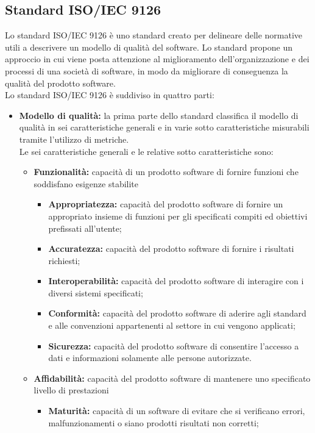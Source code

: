   	\subsection{Standard ISO/IEC 9126}
  	Lo standard ISO/IEC 9126 è uno standard creato per delineare delle normative utili a descrivere un modello di qualità del software. Lo standard propone un approccio in cui viene posta attenzione al miglioramento dell'organizzazione e dei processi di una società di software, in modo da migliorare di conseguenza la qualità del prodotto software.\\
  	Lo standard ISO/IEC 9126 è suddiviso in quattro parti:
		\begin{itemize}
			\item \textbf{Modello di qualità: } la prima parte dello standard classifica il modello di qualità in sei caratteristiche generali e in varie sotto caratteristiche misurabili tramite l'utilizzo di metriche.\\
			Le sei caratteristiche generali e le relative sotto caratteristiche sono:
				\begin{itemize}
					\item \textbf{Funzionalità:} capacità di un prodotto software di fornire funzioni che soddisfano esigenze stabilite
						\begin{itemize}
							\item \textbf{Appropriatezza:} capacità del prodotto software di fornire un appropriato insieme di funzioni per gli specificati compiti ed obiettivi prefissati all'utente;
							\item \textbf{Accuratezza:} capacità del prodotto software di fornire i risultati richiesti;
							\item \textbf{Interoperabilità:} capacità del prodotto software di interagire con i diversi sistemi specificati;
							\item \textbf{Conformità:} capacità del prodotto software di aderire agli standard e alle convenzioni appartenenti al settore in cui vengono applicati;
							\item \textbf{Sicurezza:} capacità del prodotto software di consentire l'accesso a dati e informazioni solamente alle persone autorizzate.
						\end{itemize}
					\item \textbf{Affidabilità:} capacità del prodotto software di mantenere uno specificato livello di prestazioni
						\begin{itemize}
							\item \textbf{Maturità:} capacità di un software di evitare che si verificano errori, malfunzionamenti o siano prodotti risultati non corretti;

\end{itemize}
\end{itemize}
\end{itemize}

